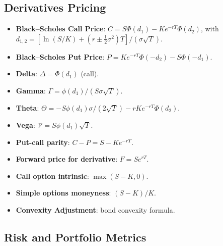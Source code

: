 \documentclass[twoside,11pt]{article}
\begin{document}
\subsection{Derivatives Pricing}\label{subsec:derivatives-pricing}
\label{sec:bench_derivatives}

\begin{itemize}
  \item \textbf{Black--Scholes Call Price}:
    $C = S\Phi(d_1) - Ke^{-rT}\Phi(d_2)$,
    with $d_{1,2} = [\ln(S/K) + (r \pm \tfrac{1}{2}\sigma^2)T] / (\sigma\sqrt{T})$.
  \item \textbf{Black--Scholes Put Price}: $P = Ke^{-rT}\Phi(-d_2) - S\Phi(-d_1)$.
  \item \textbf{Delta}: $\Delta = \Phi(d_1)$ (call).
  \item \textbf{Gamma}: $\Gamma = \phi(d_1)/(S\sigma\sqrt{T})$.
  \item \textbf{Theta}: $\Theta = -S\phi(d_1)\sigma/(2\sqrt{T}) - rKe^{-rT}\Phi(d_2)$.
  \item \textbf{Vega}: $\mathcal{V} = S\phi(d_1)\sqrt{T}$.
  \item \textbf{Put-call parity}: $C - P = S - Ke^{-rT}$.
  \item \textbf{Forward price for derivative}: $F = Se^{rT}$.
  \item \textbf{Call option intrinsic}: $\max(S - K, 0)$.
  \item \textbf{Simple options moneyness}: $(S - K)/K$.
  \item \textbf{Convexity Adjustment}: bond convexity formula.
\end{itemize}

\subsection{Risk and Portfolio Metrics}\label{subsec:risk-and-portfolio-metrics}
\label{sec:bench_risk}
\end{document}
